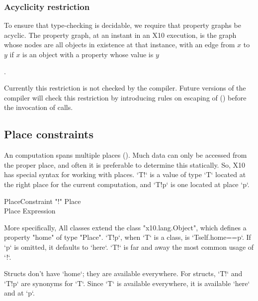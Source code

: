 \subsubsection{Acyclicity restriction}

To ensure that type-checking is decidable, we require that property graphs be
acyclic.  The property graph, at an instant in an X10 execution, is the graph
whose nodes are all objects in existence at that instance, with an edge from
{$x$} to {$y$} if {$x$} is an object with a property whose value is {$y$}{. 


Currently this restriction is not checked by the compiler. Future
versions of the compiler will check this restriction by introducing
rules on escaping of  () before the invocation of
 calls.


\subsection{Place constraints}
\label{PlaceTypes}
\label{PlaceType}
\label{DepType:PlaceType}

An \Xten{} computation spans multiple places (). Much data
can only be accessed from the proper place, and often it is preferable to
determine this statically. So, X10 has special syntax for working with places.
\xcd`T!` is a value of type \xcd`T` located at the right place for the current
computation, and \xcd`T!p` is one located at place \xcd`p`.

\begin{grammar}
PlaceConstraint     \: \xcd"!" Place\opt \\
Place              \:   Expression \\
\end{grammar}

More specifically, All \Xten{} classes extend the class \xcd"x10.lang.Object",
which defines a property \xcd"home" of type \xcd"Place".  \xcd`T!p`, when
\xcd`T` is a class, is \xcd`T{self.home==p}`.  If \xcd`p` is omitted, it
defaults to \xcd`here`.   \xcd`T!` is far and away the most common usage of
\xcd`!`. 

Structs don't have \xcd`home`; they are available everywhere.  For structs, 
\xcd`T!` and \xcd`T!p` are synonyms for \xcd`T`. Since \xcd`T` is available
everywhere, it is available \xcd`here` and at \xcd`p`. 

}
